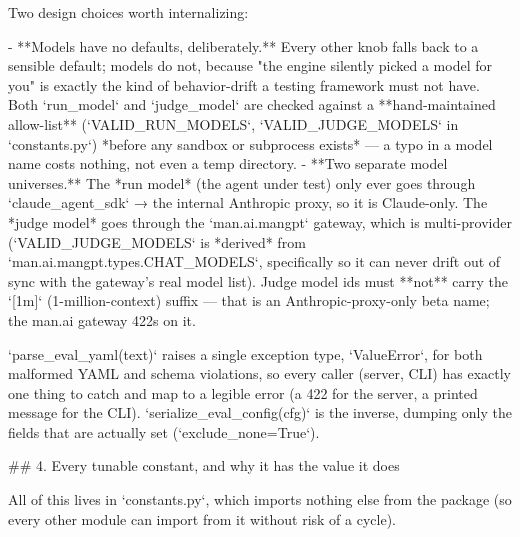 Two design choices worth internalizing:

- **Models have no defaults, deliberately.** Every other knob falls back to a sensible default; models do not, because "the engine silently picked a model for you" is exactly the kind of behavior-drift a testing framework must not have. Both `run_model` and `judge_model` are checked against a **hand-maintained allow-list** (`VALID_RUN_MODELS`, `VALID_JUDGE_MODELS` in `constants.py`) *before any sandbox or subprocess exists* — a typo in a model name costs nothing, not even a temp directory.
- **Two separate model universes.** The *run model* (the agent under test) only ever goes through `claude_agent_sdk` → the internal Anthropic proxy, so it is Claude-only. The *judge model* goes through the `man.ai.mangpt` gateway, which is multi-provider (`VALID_JUDGE_MODELS` is *derived* from `man.ai.mangpt.types.CHAT_MODELS`, specifically so it can never drift out of sync with the gateway's real model list). Judge model ids must **not** carry the `[1m]` (1-million-context) suffix — that is an Anthropic-proxy-only beta name; the man.ai gateway 422s on it.

`parse_eval_yaml(text)` raises a single exception type, `ValueError`, for both malformed YAML and schema violations, so every caller (server, CLI) has exactly one thing to catch and map to a legible error (a 422 for the server, a printed message for the CLI). `serialize_eval_config(cfg)` is the inverse, dumping only the fields that are actually set (`exclude_none=True`).

## 4. Every tunable constant, and why it has the value it does

All of this lives in `constants.py`, which imports nothing else from the package (so every other module can import from it without risk of a cycle).

